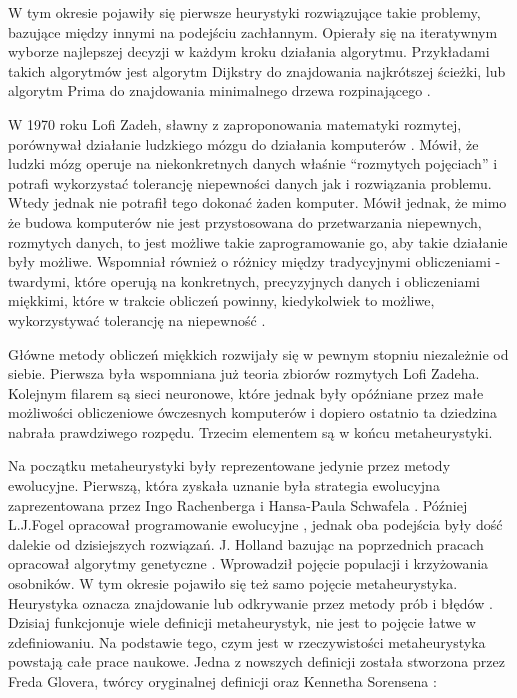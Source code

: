 \documentclass[twoside]{iisthesis}
\begin{document}
W tym okresie pojawiły się pierwsze heurystyki rozwiązujące takie problemy, bazujące między innymi na podejściu zachłannym. Opierały się na iteratywnym wyborze najlepszej decyzji w każdym kroku działania algorytmu. Przykładami takich algorytmów jest algorytm Dijkstry do znajdowania najkrótszej ścieżki, lub algorytm Prima do znajdowania minimalnego drzewa rozpinającego \cite{Cormen:2001:IA:580470}. 

W 1970 roku Lofi Zadeh, sławny z zaproponowania matematyki rozmytej, porównywał działanie ludzkiego mózgu do działania komputerów \cite{proc-zadeh}. Mówił, że ludzki mózg operuje na niekonkretnych danych właśnie ``rozmytych pojęciach'' i potrafi wykorzystać tolerancję niepewności danych jak i rozwiązania problemu. Wtedy jednak nie potrafił tego dokonać żaden komputer. Mówił jednak, że mimo że budowa komputerów nie jest przystosowana do przetwarzania niepewnych, rozmytych danych, to jest możliwe takie zaprogramowanie go, aby takie działanie były możliwe. Wspomniał również o różnicy między tradycyjnymi obliczeniami - twardymi, które operują na konkretnych, precyzyjnych danych i obliczeniami miękkimi, które w trakcie obliczeń powinny, kiedykolwiek to możliwe, wykorzystywać tolerancję na niepewność \cite{history-soft}. 

Główne metody obliczeń miękkich rozwijały się w pewnym stopniu niezależnie od siebie. Pierwsza była wspomniana już teoria zbiorów rozmytych Lofi Zadeha. Kolejnym filarem są sieci neuronowe, które jednak były opóźniane przez małe możliwości obliczeniowe ówczesnych komputerów i dopiero ostatnio ta dziedzina nabrała prawdziwego rozpędu. Trzecim elementem są w końcu metaheurystyki.

Na początku metaheurystyki były reprezentowane jedynie przez metody ewolucyjne. Pierwszą, która zyskała uznanie była strategia ewolucyjna zaprezentowana przez Ingo Rachenberga i Hansa-Paula Schwafela \cite{Rechenberg1989}. Później L.J.Fogel opracował programowanie ewolucyjne \cite{Fogel:2011}, jednak oba podejścia były dość dalekie od dzisiejszych rozwiązań. J. Holland bazując na poprzednich pracach opracował algorytmy genetyczne \cite{Yang:2011}. Wprowadził pojęcie populacji i krzyżowania osobników. W tym okresie pojawiło się też samo pojęcie metaheurystyka. Heurystyka oznacza znajdowanie lub odkrywanie przez metody prób i błędów \cite{Yang:2011}. Dzisiaj funkcjonuje wiele definicji metaheurystyk, nie jest to pojęcie łatwe w zdefiniowaniu. Na podstawie tego, czym jest w rzeczywistości metaheurystyka powstają całe prace naukowe. Jedna z nowszych definicji została stworzona przez Freda Glovera, twórcy oryginalnej definicji oraz Kennetha Sorensena \cite{history-meta}: 
\end{document}
